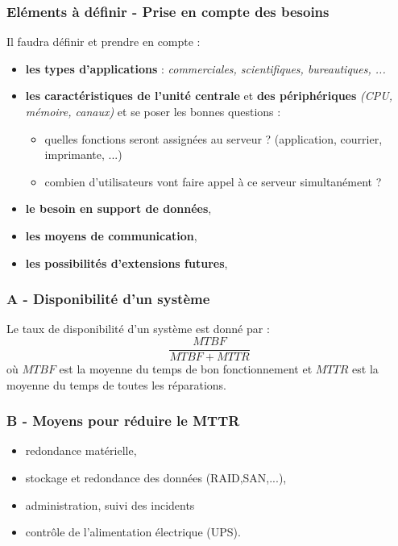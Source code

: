 \documentclass[10pt,a4paper,oneside,titlepage]{report}
\begin{document}
\subsubsection{Eléments à définir - Prise en compte des besoins}

Il faudra définir et prendre en compte :
\begin{itemize}
\item \textbf{les types d'applications} : \textit{commerciales, scientifiques, bureautiques, ...}
\item \textbf{les caractéristiques de l'unité centrale} et \textbf{des périphériques} \textit{(CPU, mémoire, canaux)} et se poser les bonnes questions :
\begin{itemize}
\item quelles fonctions seront assignées au serveur ? (application, courrier, imprimante, ...)
\item combien d'utilisateurs vont faire appel à ce serveur simultanément ?
\end{itemize}
\item \textbf{le besoin en support de données},
\item \textbf{les moyens de communication},
\item \textbf{les possibilités d'extensions futures},
\end{itemize}

\subsubsection{A - Disponibilité d'un système}

Le taux de disponibilité d'un système est donné par : $$\frac{MTBF}{MTBF+MTTR}$$ où $MTBF$ est la moyenne du temps de bon fonctionnement et $MTTR$ est la moyenne du temps de toutes les réparations.

\subsubsection{B - Moyens pour réduire le MTTR}

\begin{itemize}
\item redondance matérielle,
\item stockage et redondance des données (RAID,SAN,...),
\item administration, suivi des incidents
\item contr\^ole de l'alimentation électrique (UPS).
\end{itemize}
\end{document}
